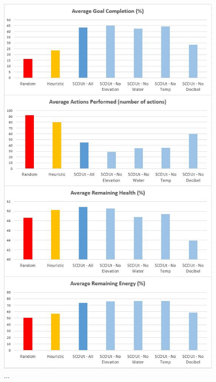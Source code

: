 \begin{figure}[H]
  \includegraphics[width=1.0\columnwidth]{Figures/Results/Experiment2/SensorChange/FindHuman.JPG}
  \caption{...}
  \label{fig:change_sensors_findhuman}
\end{figure}


